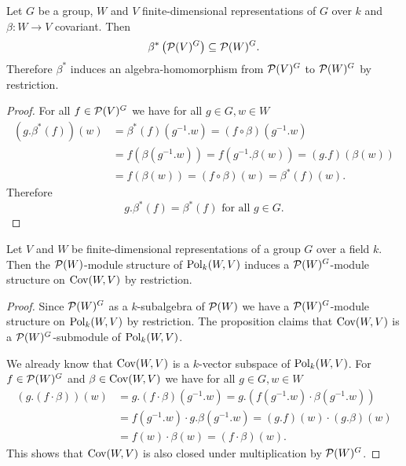 \begin{prop}
 Let $G$ be a group, $W$ and $V$ finite-dimensional representations of $G$ over $k$ and $\beta \colon W \to V$ covariant. Then
 \[
  \beta^*\left(\mathcal{P}(V)^G\right) \subseteq \mathcal{P}(W)^G.
 \]
 Therefore $\beta^*$ induces an algebra-homomorphism from $\mathcal{P}(V)^G$ to $\mathcal{P}(W)^G$ by restriction.
\end{prop}
\begin{proof}
 For all $f \in \mathcal{P}(V)^G$ we have for all $g \in G, w \in W$
 \begin{align*}
  (g.\beta^*(f))(w)
  &= \beta^*(f)\left(g^{-1}.w\right)
  = (f \circ \beta)\left(g^{-1}.w\right) \\
  &= f\left(\beta\left(g^{-1}.w\right)\right)
  = f\left(g^{-1}.\beta(w)\right)
  = (g.f)(\beta(w)) \\
  &= f(\beta(w))
  = (f \circ \beta)(w)
  = \beta^*(f)(w).
 \end{align*}
 Therefore
 \[
  g.\beta^*(f) = \beta^*(f) \text{ for all } g \in G.
 \]
\end{proof}


\begin{prop}
 Let $V$ and $W$ be finite-dimensional representations of a group $G$ over a field $k$. Then the $\mathcal{P}(W)$-module structure of $\operatorname{Pol}_k(W,V)$ induces a $\mathcal{P}(W)^G$-module structure on $\operatorname{Cov}(W,V)$ by restriction.
\end{prop}
\begin{proof}
 Since $\mathcal{P}(W)^G$ as a $k$-subalgebra of $\mathcal{P}(W)$ we have a $\mathcal{P}(W)^G$-module structure on $\operatorname{Pol}_k(W,V)$ by restriction. The proposition claims that $\operatorname{Cov}(W,V)$ is a $\mathcal{P}(W)^G$-submodule of $\operatorname{Pol}_k(W,V)$.
 
 We already know that $\operatorname{Cov}(W,V)$ is a $k$-vector subspace of $\operatorname{Pol}_k(W,V)$. For $f \in \mathcal{P}(W)^G$ and $\beta \in \operatorname{Cov}(W,V)$ we have for all $g \in G, w \in W$
 \begin{align*}
  (g.(f \cdot \beta))(w)
  &= g.(f \cdot \beta)\left(g^{-1}.w\right)
  = g.\left(f\left(g^{-1}.w\right) \cdot \beta\left(g^{-1}.w\right) \right) \\
  &= f\left(g^{-1}.w\right) \cdot g.\beta\left(g^{-1}.w\right)
  = (g.f)(w) \cdot (g.\beta)(w) \\
  &= f(w) \cdot \beta(w)
  = (f \cdot \beta)(w).
 \end{align*}
 This shows that $\operatorname{Cov}(W,V)$ is also closed under multiplication by $\mathcal{P}(W)^G$.
\end{proof}




